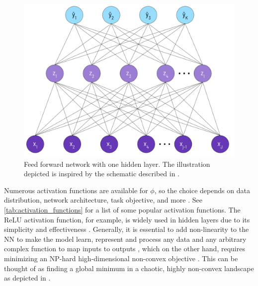 \begin{figure}[H]%
    \centering
    \includegraphics[width=\imgWidthL]{images/neural_network.png}
    \caption[One layered feed-forward network]{Feed forward network with one hidden layer. The illustration depicted is inspired by the schematic described in \cite{hastie2009elements}.}
    \label{neural_network}
\end{figure}

Numerous activation functions are available for $\phi$, so the choice depends on data distribution, network architecture, task objective, and more \cite{DBLP:journals/corr/abs-1811-03378}. See \ref{tab:activation_functions} for a list of some popular activation functions. The ReLU activation function, for example, is widely used in hidden layers due to its simplicity and effectiveness \cite{DBLP:journals/corr/abs-2101-09957}\cite{DBLP:journals/corr/abs-2109-14545}. Generally, it is essential to add non-linearity to the \ac{NN} to make the model learn, represent and process any data and any arbitrary complex function to map inputs to outputs \cite{Sharma2020}, which on the other hand, requires minimizing an NP-hard high-dimensional non-convex objective \cite{NEURIPS2018_a41b3bb3}. This can be thought of as finding a global minimum in a chaotic, highly non-convex landscape as depicted in .

